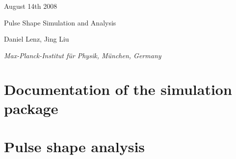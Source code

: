 \documentclass[11pt, a4paper]{article}
\begin{document}

\begin{titlepage}

\begin{figure}
\end{figure} 

\hspace{10.8cm} August 14th 2008 \\ 

\begin{center}

\vspace{1.0cm}

{\Large Pulse Shape Simulation and Analysis\\ } 

\vspace{0.5cm} 


\vspace{1.0cm}

{\large 
Daniel Lenz, Jing Liu
}

\vspace{1.0cm}

{\it 
Max-Planck-Institut f\"ur Physik, M\"unchen, Germany
} 
\vspace{2.0cm} 
\begin{abstract}
  This note contains 1. a detailed documentation of the pulse shape   simulation codes, 2. some basic verifications of the simulation   codes, and 3. some simple applications of the simulation.
\end{abstract}
\end{center} 

\end{titlepage} 



\tableofcontents

\pagebreak \setcounter{page}{1} 


\section{Documentation of the simulation package}
\label{sec:manual}








\section{Pulse shape analysis}
\label{sec:physics}


\clearpage
 

\end{document}
